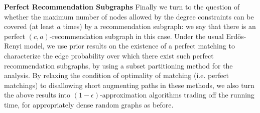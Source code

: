 \noindent
{\bf Perfect Recommendation Subgraphs}
Finally we turn to the question of whether the maximum number of nodes allowed
by the degree constraints can be covered (at least $a$ times) by a recommendation
subgraph: we say that there is an perfect $(c,a)$-recommendation subgraph in this
case. Under the usual Erd\"os-Renyi model, we use prior results on the
existence of a perfect matching to characterize the edge probability over which
there exist such perfect recommendation subgraphs, by using a subset partitioning
method for the analysis. By relaxing the condition of optimality of matching (i.e.
perfect matchings) to disallowing short augmenting paths in these methods, we also
turn the above results into $(1-\epsilon)$-approximation algorithms trading off
the running time, for appropriately dense random graphs as before. \vs
